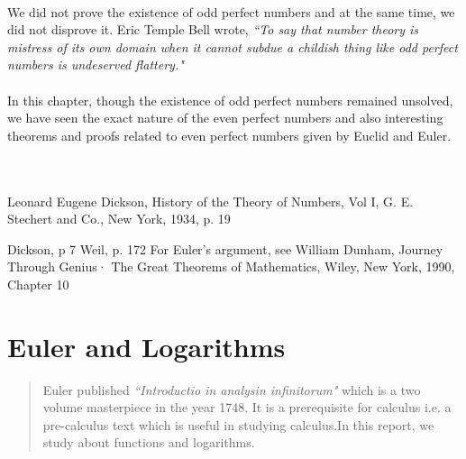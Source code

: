 \documentclass[a4paper,reqno,11pt]{book}
\theoremstyle{plain}%
\theoremstyle{definition}
\begin{document}
\\
We did not prove the existence of odd perfect numbers and at the same time, we did not disprove it. Eric Temple Bell wrote, \textit{``To 
say that number theory is mistress of its own domain when it cannot subdue 
a childish thing like odd perfect numbers is undeserved flattery."} \\
\\
In this chapter, though the existence of odd perfect numbers remained unsolved, we have seen the exact nature of the even perfect numbers and also interesting theorems and proofs related to even perfect numbers given by Euclid and Euler.\\
\\
\\
\begin{thebibliography}{99}
		
		 Leonard Eugene Dickson, History of the Theory of Numbers, Vol I, G. E. Stechert and Co., New 
York, 1934, p. 19 

		
		 Dickson, p 7 
   Weil, p. 172
   For Euler's argument, see William Dunham, Journey Through Genius· The Great Theorems of 
Mathematics, Wiley, New York, 1990, Chapter 10


 
		

		
		
	\end{thebibliography}
\chapter{Euler and Logarithms}
	
	
	
	




	
	
	
	
	
	
	
	\begin{abstract}
		Euler published \textit{``Introductio in analysin infinitorum"} which is a two volume masterpiece in the year 1748. It is a prerequisite for calculus i.e. a pre-calculus text which is useful in studying calculus.In this report, we study about functions and logarithms.
	\end{abstract}
\end{document}
